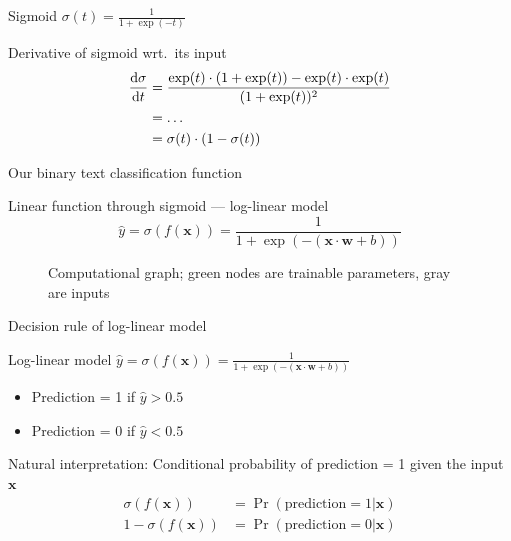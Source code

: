 \documentclass[12pt,aspectratio=169,handout]{beamer}
\begin{document}
\begin{frame}{Sigmoid $\sigma(t) = \frac{1}{1 + \exp(-t)}$}

\begin{block}{Derivative of sigmoid wrt.\ its input}
$$
\begin{aligned}
\dv{\sigma}{t}
&=\frac {\exp(t) \cdot (1+\exp(t)) - \exp(t) \cdot \exp(t)}{(1+\exp(t))^{2}} \\
&= \ldots \\
&= \sigma(t) \cdot \left( 1- \sigma(t) \right)
\end{aligned}
$$	
\end{block}



\end{frame}

\begin{frame}{Our binary text classification function}

Linear function through sigmoid --- log-linear model
$$
\hat{y} = \sigma(f(\bm{x})) = \frac{1}{1 + \exp(- (\bm{x} \cdot \bm{w} + b))}
$$	

\begin{figure}
\caption{Computational graph; green nodes are trainable parameters, gray are inputs}
\end{figure}
	
\end{frame}

\begin{frame}{Decision rule of log-linear model}
	
Log-linear model
$
\hat{y} = \sigma(f(\bm{x})) = \frac{1}{1 + \exp(- (\bm{x} \cdot \bm{w} + b))}
$	

\begin{itemize}
	\item Prediction = 1 if $\hat{y} > 0.5$	
	\item Prediction = 0 if $\hat{y} < 0.5$
\end{itemize}

\bigskip

Natural interpretation: Conditional probability of prediction = 1 given the input $\bm{x}$
$$
\begin{aligned}
\sigma(f(\bm{x})) &= \Pr(\text{prediction} = 1 | \bm{x}) \\
1 - \sigma(f(\bm{x})) &= \Pr(\text{prediction} = 0 | \bm{x})
\end{aligned}
$$

\end{frame}
\end{document}
